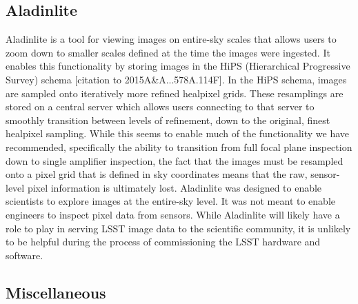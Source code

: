 \subsection{Aladinlite}

Aladinlite is a tool for viewing images on entire-sky scales that allows users
to zoom down to smaller scales defined at the time the images were ingested.
It enables this functionality by storing images in the HiPS (Hierarchical
Progressive Survey) schema [citation to 2015A\&A...578A.114F].  In the HiPS
schema, images are sampled onto iteratively more refined healpixel grids.  These
resamplings are stored on a central server which allows users connecting to that
server to smoothly transition between levels of refinement, down to the
original, finest healpixel sampling.  While this seems to enable much of the
functionality we have recommended, specifically the ability to transition from
full focal plane inspection down to single amplifier inspection, the fact that
the images must be resampled onto a pixel grid that is defined in sky
coordinates means that the raw, sensor-level pixel information is ultimately
lost.  Aladinlite was designed to enable scientists to explore images at the
entire-sky level.  It was not meant to enable engineers to inspect pixel data
from sensors.  While Aladinlite will likely have a role to play in serving LSST
image data to the scientific community, it is unlikely to be helpful during the
process of commissioning the LSST hardware and software.

\subsection{Miscellaneous}
